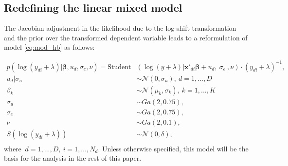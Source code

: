 \subsection{Redefining the linear mixed model}

The Jacobian adjustment in the likelihood due to the log-shift transformation and the prior over the transformed dependent variable leads to a reformulation of model \ref{eq:mod_hb} as follows:

\begin{equation}
    \begin{split}
        p(\log(y_{di} + \lambda) |\boldsymbol \beta, u_d, \sigma_e, \nu)   =        \text{Student}&(\log(y + \lambda)| \boldsymbol{x'}_{di} \boldsymbol \beta + u_d,\ \sigma_e\ , \nu)\cdot (y_{di} + \lambda)^{-1}, \\
        u_d | \sigma_u & \sim \mathcal N(0, \sigma_u),\ d = 1, ..., D \\
        \beta_k & \sim \mathcal N(\mu_k, \sigma_k),\ k = 1, ..., K\\
        \sigma_u & \sim Ga(2, 0.75), \\
        \sigma_e & \sim Ga(2, 0.75), \\
        \nu & \sim Ga(2, 0.1), \\
        S(\log(y_{di} + \lambda)) & \sim \mathcal N(0, \delta),\\
    \end{split}
    \label{eq:trafo_hb}
\end{equation}
where $\ d = 1, ..., D,\ i = 1, ..., N_d$. Unless otherwise specified, this model will be the basis for the analysis in the rest of this paper.


